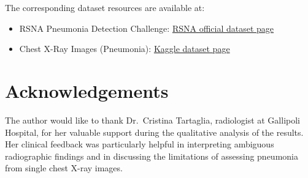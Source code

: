 \documentclass[11pt,a4paper]{article}
\begin{document}
The corresponding dataset resources are available at:

\begin{itemize}
    \item RSNA Pneumonia Detection Challenge:
    \href{https://www.rsna.org/challenge-datasets/2018}{RSNA official dataset page}
    
    \item Chest X-Ray Images (Pneumonia):
    \href{https://www.kaggle.com/datasets/paultimothymooney/chest-xray-pneumonia}{Kaggle dataset page}
\end{itemize}

\section{Acknowledgements}

The author would like to thank Dr.~Cristina Tartaglia, radiologist at
Gallipoli Hospital, for her valuable support during the qualitative analysis
of the results. Her clinical feedback was particularly helpful in interpreting
ambiguous radiographic findings and in discussing the limitations of assessing
pneumonia from single chest X-ray images.



\cleardoublepage
\end{document}
